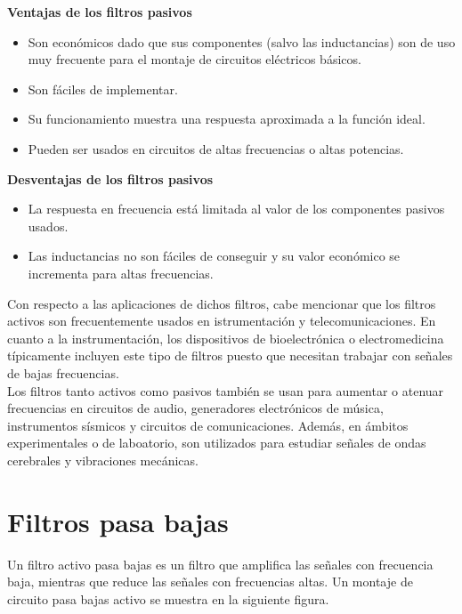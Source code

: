 \documentclass[prb,aps,preprintnumbers,amsmath,amssymb]{revtex4}
\begin{document}
\textbf{Ventajas de los filtros pasivos}

\begin{itemize}
	\item Son económicos dado que sus componentes (salvo las inductancias) son de uso muy frecuente para el montaje de circuitos eléctricos básicos.
	
	\item Son fáciles de implementar.
	
	\item Su funcionamiento muestra una respuesta aproximada a la función ideal.
	
	\item Pueden ser usados en circuitos de altas frecuencias o altas potencias.
\end{itemize}

\textbf{Desventajas de los filtros pasivos}

\begin{itemize}
	\item La respuesta en frecuencia está limitada al valor de los componentes pasivos usados.
	
	\item Las inductancias no son fáciles de conseguir y su valor económico se incrementa para altas frecuencias.
\end{itemize}

Con respecto a las aplicaciones de dichos filtros, cabe mencionar que los filtros activos son frecuentemente usados en istrumentación y telecomunicaciones. En cuanto a la instrumentación, los dispositivos de bioelectrónica o electromedicina típicamente incluyen este tipo de filtros puesto que necesitan trabajar con señales de bajas frecuencias. \\

Los filtros tanto activos como pasivos también se usan para aumentar o atenuar frecuencias en circuitos de audio, generadores electrónicos de música, instrumentos sísmicos y circuitos de comunicaciones. Además, en ámbitos experimentales o de laboatorio, son utilizados para estudiar señales de ondas cerebrales y vibraciones mecánicas.\\

\section{Filtros pasa bajas}
Un filtro activo pasa bajas es un filtro que amplifica las señales con frecuencia baja, mientras que reduce las señales con frecuencias altas. Un montaje de circuito pasa bajas activo se muestra en la siguiente figura.\\
\end{document}
